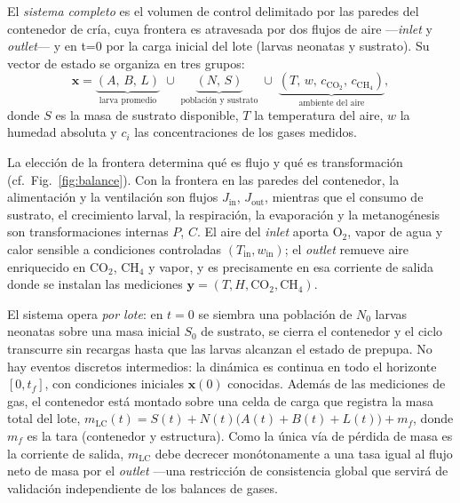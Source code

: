 \begin{definition}\label{def32}
El \emph{sistema completo} es el volumen de control delimitado por las
paredes del contenedor de cría, cuya frontera es atravesada por dos flujos
de aire ---\emph{inlet} y \emph{outlet}--- y en t=0  por la carga inicial del lote 
(larvas neonatas y sustrato). Su vector de estado se organiza en
tres grupos:
\begin{equation}
\mathbf{x} =
\underbrace{(A,\, B,\, L)}_{\text{larva promedio}}
\;\cup\;
\underbrace{(N,\, S)}_{\text{población y sustrato}}
\;\cup\;
\underbrace{(T,\, w,\, c_{\mathrm{CO_2}},\, c_{\mathrm{CH_4}})}_{\text{ambiente del aire}},
\label{eq:estado-completo}
\end{equation}
donde $S$ es la masa de sustrato disponible, $T$ la temperatura del aire,
$w$ la humedad absoluta y $c_i$ las concentraciones de los gases medidos.
\end{definition}

\begin{remark}\label{rem:frontera}
La elección de la frontera determina qué es flujo y qué es transformación
(cf.~Fig.~\ref{fig:balance}). Con la frontera en las paredes del contenedor,
la alimentación y la ventilación son flujos $J_{\mathrm{in}}$,
$J_{\mathrm{out}}$, mientras que el consumo de sustrato, el crecimiento
larval, la respiración, la evaporación y la metanogénesis son
transformaciones internas $P$, $C$. El aire del \emph{inlet} aporta O$_2$,
vapor de agua y calor sensible a condiciones controladas
$(T_{\mathrm{in}}, w_{\mathrm{in}})$; el \emph{outlet} remueve aire
enriquecido en CO$_2$, CH$_4$ y vapor, y es precisamente en esa corriente de
salida donde se instalan las mediciones
$\mathbf{y} = (T, H, \mathrm{CO_2}, \mathrm{CH_4})$.
\end{remark}

\begin{remark}\label{rem:batch}
El sistema opera \emph{por lote}: en $t = 0$ se siembra una población de
$N_0$ larvas neonatas sobre una masa inicial $S_0$ de sustrato, se cierra el
contenedor y el ciclo transcurre sin recargas hasta que las larvas alcanzan
el estado de prepupa. No hay eventos discretos intermedios: la dinámica es
continua en todo el horizonte $[0, t_f]$, con condiciones iniciales
$\mathbf{x}(0)$ conocidas. Además de las mediciones de gas, el contenedor
está montado sobre una celda de carga que registra la masa total del lote,
$m_{\mathrm{LC}}(t) = S(t) + N(t)\bigl(A(t) + B(t) + L(t)\bigr) + m_f$,
donde $m_f$ es la tara (contenedor y estructura). Como la única vía de
pérdida de masa es la corriente de salida, $m_{\mathrm{LC}}$ debe decrecer
monótonamente a una tasa igual al flujo neto de masa por el \emph{outlet}
---una restricción de consistencia global que servirá de validación
independiente de los balances de gases.
\end{remark}

